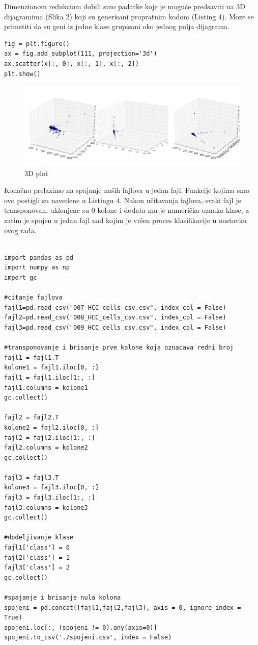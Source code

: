 \documentclass[14pt]{extarticle}
\begin{document}
Dimenzionom redukciom dobili smo padatke koje je moguće predsaviti na 3D dijagramima (Slika 2) koji su generisani propratnim kodom (Listing 4). Moze se primetiti da su geni iz jedne klase grupisani oko jednog polja dijagrama. 

\begin{lstlisting}[caption={Vizuelizacija},frame=single, label=simple]
fig = plt.figure()
ax = fig.add_subplot(111, projection='3d')
ax.scatter(x[:, 0], x[:, 1], x[:, 2])
plt.show()

\end{lstlisting}
\begin{figure}[h!]
\begin{center}
\includegraphics[scale=0.25]{slika2.jpg}
\end{center}
\caption{3D plot}
\label{fig:pande}
\end{figure}

Konačno prelazimo na spajanje naših fajlova u jedan fajl. Funkcije kojima smo ovo postigli su navedene u Listingu 4. Nakon učitavanja fajlova, svaki fajl je transponovan, uklonjene su 0 kolone i dodata mu je numerička oznaka klase, a zatim je spojen u jedan fajl nad kojim je vršen proces klasifikacije u nastavku ovog rada. 

\begin{lstlisting}[caption={Spajanje},frame=single, label=simple]

import pandas as pd
import numpy as np
import gc

#citanje fajlova
fajl1=pd.read_csv("007_HCC_cells_csv.csv", index_col = False)
fajl2=pd.read_csv("008_HCC_cells_csv.csv", index_col = False)
fajl3=pd.read_csv("009_HCC_cells_csv.csv", index_col = False)

#transponovanje i brisanje prve kolone koja oznacava redni broj
fajl1 = fajl1.T
kolone1 = fajl1.iloc[0, :]
fajl1 = fajl1.iloc[1:, :]
fajl1.columns = kolone1
gc.collect()

fajl2 = fajl2.T
kolone2 = fajl2.iloc[0, :]
fajl2 = fajl2.iloc[1:, :]
fajl2.columns = kolone2
gc.collect()

fajl3 = fajl3.T
kolone3 = fajl3.iloc[0, :]
fajl3 = fajl3.iloc[1:, :]
fajl3.columns = kolone3
gc.collect()

#dodeljivanje klase
fajl1['class'] = 0
fajl2['class'] = 1
fajl3['class'] = 2
gc.collect()

#spajanje i brisanje nula kolona
spojeni = pd.concat([fajl1,fajl2,fajl3], axis = 0, ignore_index = True)
spojeni.loc[:, (spojeni != 0).any(axis=0)]
spojeni.to_csv('./spojeni.csv', index = False)
  

\end{lstlisting}
\end{document}
